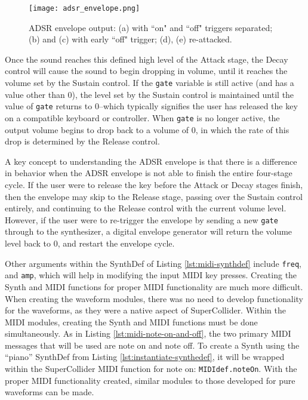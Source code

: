 \begin{figure}
  \centering
  \texttt{[image: adsr\_envelope.png]}
  \caption{ADSR envelope output: (a) with ``on" and ``off" triggers separated; (b) and (c) with early ``off" trigger; (d), (e) re-attacked.} \cite{Puckette_2007}
  \label{fig:adsr-envelope}
\end{figure}

Once the sound reaches this defined high level of the Attack stage, the Decay control will cause the sound to begin dropping in volume, until it reaches the volume set by the Sustain control. If the \texttt{gate} variable is still active (and has a value other than 0), the level set by the Sustain control is maintained until the value of \texttt{gate} returns to 0--which typically signifies the user has released the key on a compatible keyboard or controller. When \texttt{gate} is no longer active, the output volume begins to drop back to a volume of 0, in which the rate of this drop is determined by the Release control. 

A key concept to understanding the ADSR envelope is that there is a difference in behavior when the ADSR envelope is not able to finish the entire four-stage cycle. If the user were to release the key before the Attack or Decay stages finish, then the envelope may skip to the Release stage, passing over the Sustain control entirely, and continuing to the Release control with the current volume level. However, if the user were to re-trigger the envelope by sending a new \texttt{gate} through to the synthesizer, a digital envelope generator will return the volume level back to 0, and restart the envelope cycle.

Other arguments within the SynthDef of Listing \ref{lst:midi-synthdef} include \texttt{freq}, and \texttt{amp}, which will help in modifying the input MIDI key presses. Creating the Synth and MIDI functions for proper MIDI functionality are much more difficult. When creating the waveform modules, there was no need to develop functionality for the waveforms, as they were a native aspect of SuperCollider. Within the MIDI modules, creating the Synth and MIDI functions must be done simultaneously. As in Listing \ref{lst:midi-note-on-and-off}, the two primary MIDI messages that will be used are note on and note off. To create a Synth using the ``piano'' SynthDef from Listing \ref{lst:instantiate-synthedef}, it will be wrapped within the SuperCollider MIDI function for note on: \texttt{MIDIdef.noteOn}. With the proper MIDI functionality created, similar modules to those developed for pure waveforms can be made.

